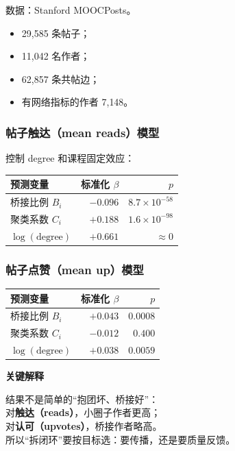 \documentclass[UTF8,a4paper,11pt]{ctexart}
\newenvironment{explainbox}[1]
{\begin{center}\begin{minipage}{0.94\textwidth}\colorbox{boxbg}{\parbox{0.92\textwidth}{\textbf{#1}\par\vspace{2pt}}}}
{\end{minipage}\end{center}}
\begin{document}
数据：Stanford MOOCPosts。

\begin{itemize}[leftmargin=2em]
\item 29{,}585 条帖子；
\item 11{,}042 名作者；
\item 62{,}857 条共帖边；
\item 有网络指标的作者 7{,}148。
\end{itemize}

\subsubsection{帖子触达（mean reads）模型}

控制 degree 和课程固定效应：

\begin{center}
\begin{longtable}{@{}lrr@{}}
\toprule
\textbf{预测变量} & \textbf{标准化 $\beta$} & \textbf{$p$} \\
\midrule
桥接比例 $B_i$ & $-0.096$ & $8.7\times10^{-58}$ \\
聚类系数 $C_i$ & $+0.188$ & $1.6\times10^{-98}$ \\
$\log(\text{degree})$ & $+0.661$ & $\approx0$ \\
\bottomrule
\end{longtable}
\end{center}

\subsubsection{帖子点赞（mean up）模型}

\begin{center}
\begin{longtable}{@{}lrr@{}}
\toprule
\textbf{预测变量} & \textbf{标准化 $\beta$} & \textbf{$p$} \\
\midrule
桥接比例 $B_i$ & $+0.043$ & $0.0008$ \\
聚类系数 $C_i$ & $-0.012$ & $0.400$ \\
$\log(\text{degree})$ & $+0.038$ & $0.0059$ \\
\bottomrule
\end{longtable}
\end{center}

\begin{explainbox}{关键解释}
结果不是简单的“抱团坏、桥接好”：\\
对\textbf{触达（reads）}，小圈子作者更高；\\
对\textbf{认可（upvotes）}，桥接作者略高。\\
所以“拆闭环”要按目标选：要传播，还是要质量反馈。
\end{explainbox}
\end{document}
